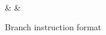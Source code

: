 \begin{figure}[h]
	\centering
	\begin{bytefield}[endianness=big,bitwidth=0.05\linewidth]{16}
		 \\
		 &
		 &
	\end{bytefield}

	\caption{Branch instruction format}
	\label{fig:new_branch_format}
\end{figure}

